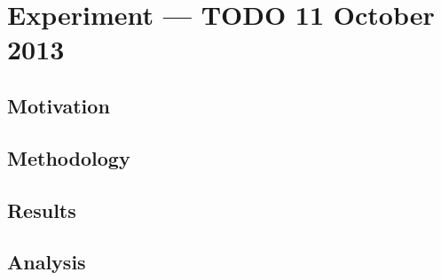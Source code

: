 \section{Experiment --- TODO 11 October 2013}

\subsection{Motivation}

\subsection{Methodology}

\subsection{Results}

\subsection{Analysis}
